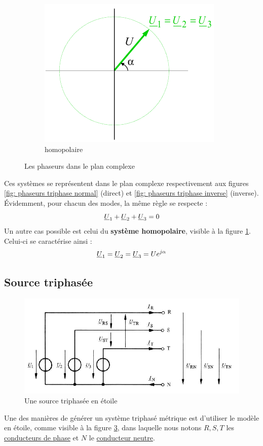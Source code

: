 \documentclass[12pt,a4paper]{article}
\newcommand{\uu}{\uline{U} }
\begin{document}
\begin{figure}
\begin{subfigure}[b]{0.3\textwidth}
		\centering
		\includegraphics[scale=0.6]{images/systeme_homopolaire}
		\caption{homopolaire}
		\label{fig: phaseur systeme homopolaire}
	\end{subfigure}
	\caption{Les phaseurs dans le plan complexe}
	\label{figs: systeme normal inverse homopolaire}
\end{figure}
Ces systèmes se représentent dans le plan complexe respectivement aux figures \ref{fig: phaseurs triphase normal} (direct) et \ref{fig: phaseurs triphase inverse} (inverse). Évidemment, pour chacun des modes, la même règle se respecte :
\begin{equation}
	\uu_1 + \uu_2 + \uu_3 = 0
\end{equation}
Un autre cas possible est celui du \textbf{système homopolaire}, visible à la figure \ref{fig: phaseur systeme homopolaire}. Celui-ci se caractérise ainsi :
\textcolor{green}{\begin{equation}
\uu_1 = \uu_2 = \uu_3 = Ue^{j\alpha}
\end{equation}}

\subsection{Source triphasée}
\begin{figure}
	\centering
	\includegraphics[scale=0.7]{images/source_triphasee_etoile}
	\caption{Une source triphasée en étoile}
	\label{fig: source triphasee etoile}
\end{figure}
Une des manières de générer un système triphasé métrique est d'utiliser le modèle en étoile, comme visible à la figure \ref{fig: source triphasee etoile}, dans laquelle nous notons $R,S,T$ les \uline{conducteurs de phase} et $N$ le \uline{conducteur neutre}. 
\end{document}
